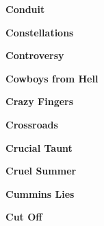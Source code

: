 \vspace{10pt} 
\begin{center}\textbf{Conduit}\end{center}
\newline
\vspace{10pt} 
\begin{center}\textbf{Constellations}\end{center}
\newline
\vspace{10pt} 
\begin{center}\textbf{Controversy}\end{center}
\newline
\vspace{10pt} 
\begin{center}\textbf{Cowboys from Hell}\end{center}
\newline
\vspace{10pt} 
\begin{center}\textbf{Crazy Fingers}\end{center}
\newline
\vspace{10pt} 
\begin{center}\textbf{Crossroads}\end{center}
\newline
\vspace{10pt} 
\begin{center}\textbf{Crucial Taunt}\end{center}
\newline
\vspace{10pt} 
\begin{center}\textbf{Cruel Summer}\end{center}
\newline
\vspace{10pt} 
\begin{center}\textbf{Cummins Lies}\end{center}
\newline
\vspace{10pt} 
\begin{center}\textbf{Cut Off}\end{center}
